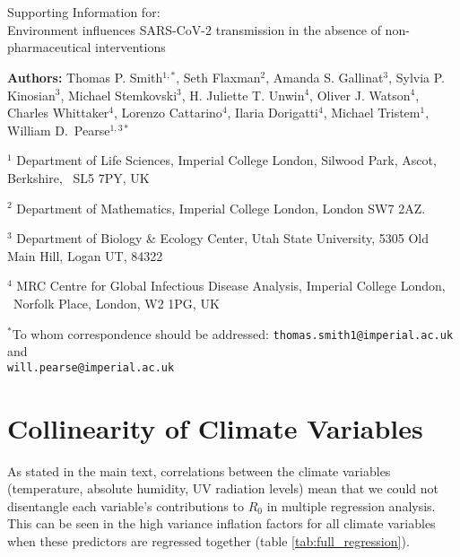 \documentclass[12pt,english,a4paper]{article}
\newcommand{\RO}{$R_0$\xspace}
\begin{document}
\setlength{\parindent}{0pt}

\section*{}

Supporting Information for: \\ Environment influences SARS-CoV-2 transmission in the absence of non-pharmaceutical interventions


\textbf{Authors:} Thomas P. Smith$^{1,*}$,
Seth Flaxman$^2$, Amanda S. Gallinat$^3$, Sylvia P. Kinosian$^3$, Michael Stemkovski$^3$,
H. Juliette T. Unwin$^4$,
Oliver J. Watson$^4$, Charles Whittaker$^4$,
Lorenzo Cattarino$^4$, Ilaria Dorigatti$^4$, Michael Tristem$^1$,
William D.\ Pearse$^{1,3*}$

$^1$ Department of Life Sciences, Imperial College London, Silwood Park, Ascot, Berkshire, \
 SL5 7PY, UK
 
$^2$ Department of Mathematics, Imperial College London, London SW7 2AZ.

$^3$ Department of Biology \& Ecology Center, Utah State University,
5305 Old Main Hill, Logan UT, 84322

$^4$ MRC Centre for Global Infectious Disease Analysis, Imperial College London, \ 
Norfolk Place, London, W2 1PG, UK 

$^*$To whom correspondence should be addressed:
\texttt{thomas.smith1@imperial.ac.uk} and \\
\texttt{will.pearse@imperial.ac.uk}

\clearpage

\tableofcontents

\clearpage

\section{Collinearity of Climate Variables}

As stated in the main text, correlations between the climate variables (temperature, absolute humidity, UV radiation levels) mean that we could not disentangle each variable's contributions to \RO in multiple regression analysis. This can be seen in the high variance inflation factors for all climate variables when these predictors are regressed together (table \ref{tab:full_regression}).
\end{document}
